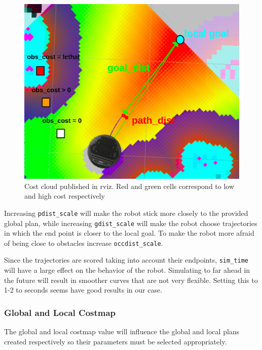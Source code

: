 \documentclass[12pt]{article}
\begin{document}
\begin{figure}[!htb]
    \centering
    \includegraphics[scale=0.3]{cost_cloud.png}
    \caption{Cost cloud published in rviz. Red and green cells correspond to low and high cost respectively}
    \label{fig:my_label}
\end{figure}


Increasing \texttt{pdist\_scale} will make the robot stick more closely to the provided global plan, while increasing \texttt{gdist\_scale} will make the robot choose trajectories in which the end point is closer to the local goal. To make the robot more afraid of being close to obstacles increase \texttt{occdist\_scale}.

Since the trajectories are scored taking into account their endpoints, \texttt{sim\_time} will have a large effect on the behavior of the robot. Simulating to far ahead in the future  will result in smoother curves that are not very flexible. Setting this to 1-2 to seconds seems have good results in our case.

\subsubsection{Global and Local Costmap}
The global and local costmap value will influence the global and local plans created respectively so their parameters must be selected appropriately.
\end{document}
